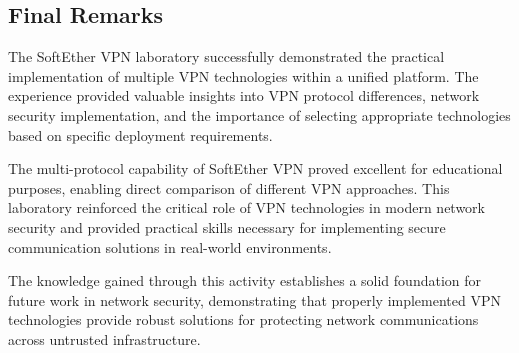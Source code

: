 \subsection{Final Remarks}

The SoftEther VPN laboratory successfully demonstrated the practical implementation of multiple VPN technologies within a unified platform. The experience provided valuable insights into VPN protocol differences, network security implementation, and the importance of selecting appropriate technologies based on specific deployment requirements.

The multi-protocol capability of SoftEther VPN proved excellent for educational purposes, enabling direct comparison of different VPN approaches. This laboratory reinforced the critical role of VPN technologies in modern network security and provided practical skills necessary for implementing secure communication solutions in real-world environments.

The knowledge gained through this activity establishes a solid foundation for future work in network security, demonstrating that properly implemented VPN technologies provide robust solutions for protecting network communications across untrusted infrastructure.

